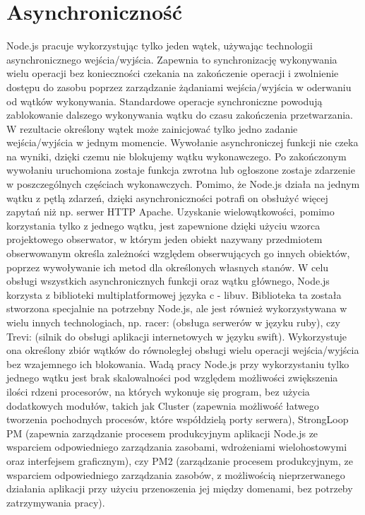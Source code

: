 \documentclass[12pt]{report}
\begin{document}
\section{Asynchroniczność}
Node.js pracuje wykorzystując tylko jeden wątek, używając technologii asynchronicznego wejścia/wyjścia. 
Zapewnia to synchronizację wykonywania wielu operacji bez konieczności czekania na zakończenie operacji i zwolnienie dostępu do zasobu poprzez zarządzanie żądaniami wejścia/wyjścia w oderwaniu od wątków wykonywania. 
Standardowe operacje synchroniczne powodują zablokowanie dalszego wykonywania wątku do czasu zakończenia przetwarzania. 
W rezultacie określony wątek może zainicjować tylko jedno zadanie wejścia/wyjścia w jednym momencie. 
Wywołanie asynchroniczej funkcji nie czeka na wyniki, dzięki czemu nie blokujemy wątku wykonawczego. 
Po zakończonym wywołaniu uruchomiona zostaje funkcja zwrotna lub ogłoszone zostaje zdarzenie w poszczególnych częściach wykonawczych. 
Pomimo, że Node.js działa na jednym wątku z pętlą zdarzeń, dzięki asynchroniczności potrafi on obsłużyć więcej zapytań niż np. serwer HTTP Apache. 
Uzyskanie wielowątkowości, pomimo korzystania tylko z jednego wątku, jest zapewnione dzięki użyciu wzorca projektowego obserwator, w którym jeden obiekt nazywany przedmiotem obserwowanym określa zależności względem obserwujących go innych obiektów, poprzez wywoływanie ich metod dla określonych własnych stanów. 
W celu obsługi wszystkich asynchronicznych funkcji oraz wątku głównego, Node.js korzysta z biblioteki multiplatformowej języka c - libuv. 
Biblioteka ta została stworzona specjalnie na potrzebny Node.js, ale jest również wykorzystywana w wielu innych technologiach, np. racer: (obsługa serwerów w języku ruby), czy Trevi: (silnik do obsługi aplikacji internetowych w języku swift). 
Wykorzystuje ona określony zbiór wątków do równoległej obsługi wielu operacji wejścia/wyjścia bez wzajemnego ich blokowania. 
Wadą pracy Node.js przy wykorzystaniu tylko jednego wątku jest brak skalowalności pod względem możliwości zwiększenia ilości rdzeni procesorów, na których wykonuje się program, bez użycia dodatkowych modułów, takich jak Cluster (zapewnia możliwość łatwego tworzenia pochodnych procesów, które współdzielą porty serwera), StrongLoop PM (zapewnia zarządzanie procesem produkcyjnym aplikacji Node.js ze wsparciem odpowiedniego zarządzania zasobami, wdrożeniami wielohostowymi oraz interfejsem graficznym), czy PM2 (zarządzanie procesem produkcyjnym, ze wsparciem odpowiedniego zarządzania zasobów, z możliwością nieprzerwanego działania aplikacji przy użyciu przenoszenia jej między domenami, bez potrzeby zatrzymywania pracy). 
\end{document}
